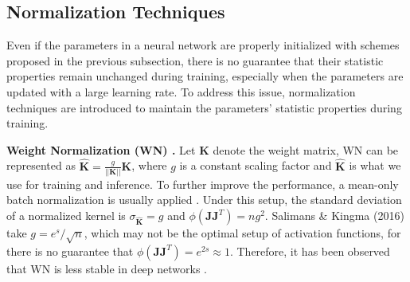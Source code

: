\documentclass[10pt,journal,compsoc]{IEEEtran}
\newtheorem{corollary}{Remark}[section]
\begin{document}
\begin{comment}
\begin{corollary}
Leaky ReLU with a relatively large $\gamma$ should surpass ReLU when the linear transforms are orthogonal.
\label{coro:leaky_relu_larg_gamma}
\end{corollary}

\textbf{Comparison. } For fully-connected layer with and ReLU activation function, $\varphi(\mathbf{J_iJ_i}^T)$ of orthogonal initialization is almost $\frac{1}{2}$ $\varphi(\mathbf{J_iJ_i}^T)$ of Gaussian initialization, which makes it more stable. This may explains why vanilla networks with orthogonal initialization performs better compared with which using Gaussian initialization \cite{saxe2013exact}.

\end{comment} \vspace{-10pt}
\subsection{Normalization Techniques}
Even if the parameters in a neural network are properly initialized with schemes proposed in the previous subsection, there is no guarantee that their statistic properties remain unchanged during training, especially when the parameters are updated with a large learning rate. To address this issue, normalization techniques are introduced to maintain the parameters' statistic properties during training.

\textbf{Weight Normalization (WN) \cite{salimans2016weight}.} Let $\mathbf{K}$ denote the weight matrix, WN can be represented as $\hat{\mathbf{K}} = \frac{g}{||\mathbf{K}||}\mathbf{K}$, where $g$ is a constant scaling factor and $\hat{\mathbf{K}}$ is what we use for training and inference. To further improve the performance, a mean-only batch normalization is usually applied \cite{salimans2016weight}. Under this setup, the standard deviation of a normalized kernel is $\sigma_{\hat{\mathbf{K}}} = g$ and $\phi(\mathbf{JJ}^T)=ng^2$.
Salimans \& Kingma (2016) \cite{salimans2016weight} take $g=e^s/\sqrt{n}$, which may not be the optimal setup of activation functions, for there is no guarantee that $\phi(\mathbf{JJ}^T)=e^{2s}\approx1$. Therefore, it has been observed that WN is less stable in deep networks \cite{gitman2017comparison}.
\end{document}

